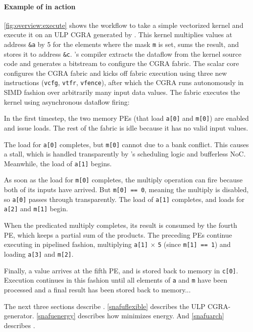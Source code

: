 \paragraph{Example of \snafu in action}
\autoref{fig:overview:execute} shows the workflow to take a simple vectorized kernel and execute it on an ULP CGRA generated by \snafuframe.
%
This kernel multiplies values at address {\tt \&a} by 5 for the elements where the mask {\tt m} is set,
  sums the result, and stores it to address {\tt \&c}.
% 
\snafuframe's compiler extracts the dataflow from the kernel source code and generates a bitstream to configure the CGRA fabric.
%
The scalar core configures the CGRA fabric and kicks off fabric execution using three new instructions ({\tt vcfg}, {\tt vtfr}, {\tt vfence}),
after which the CGRA runs autonomously in SIMD fashion over arbitrarily many input data values.
% 
The fabric executes the kernel using asynchronous dataflow firing:
\begin{compactitem}
\item[\circled{1}]
In the first timestep, the two memory PEs (that load {\tt a[0]} and {\tt m[0]}) are enabled and issue loads.
%
The rest of the fabric is idle because it has no valid input values.
\item[\circled{2}]
The load for {\tt a[0]} completes, but {\tt m[0]} cannot due to a bank conflict.
%
This causes a stall, which is handled transparently by \snafuframe's scheduling logic and bufferless NoC.
%
Meanwhile, the load of {\tt a[1]} begins.
%
\item[\circled{3}]
% 
As soon as the load for {\tt m[0]} completes, the multiply operation can fire because both of its inputs have arrived.
% 
But {\tt m[0] == 0}, meaning the multiply is disabled, so {\tt a[0]} passes through transparently.
%
The load of {\tt a[1]} completes, and loads for {\tt a[2]} and {\tt m[1]} begin.
%
\item[\circled{4}]
%
When the predicated multiply completes, its result is consumed by the fourth PE, which keeps a partial sum of the products.
%
The preceding PEs continue executing in pipelined fashion,
multiplying {\tt a[1]} $\times$ {\tt 5} (since {\tt m[1] == 1}) and loading {\tt a[3]} and {\tt m[2]}.
%
\item[\circled{5}]
%
Finally, a value arrives at the fifth PE, and is stored back to memory in {\tt c[0]}.
%
Execution continues in this fashion until all elements of {\tt a} and {\tt m} have been processed and a final result has been stored back to memory...
\end{compactitem}

\noindent
The next three sections describe \snafuframe.
% 
\autoref{snafuflexible} describes the \snafuframe ULP CGRA-generator.
% 
\autoref{snafuenergy} describes how \snafuframe minimizes energy.
% 
And \autoref{snafuarch} describes \snafuarch.

